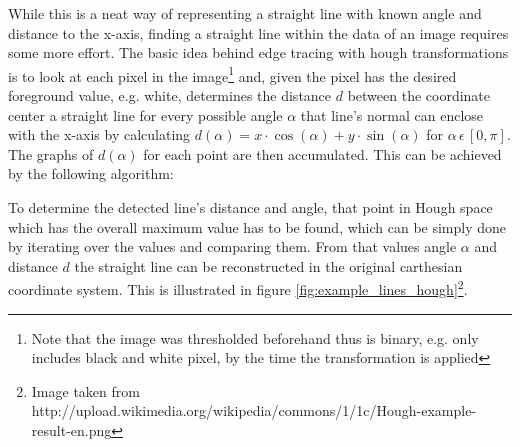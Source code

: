 \documentclass[a4paper, 12pt, twoside]{article}
\begin{document}
While this is a neat way of representing a straight line with known angle and
distance to the x-axis, finding a straight line within the data of an image
requires some more effort. The basic idea behind edge tracing with hough
transformations is to look at each pixel in the image\footnote{Note that the
image was thresholded beforehand thus is binary, e.g. only includes black and
white pixel, by the time the transformation is applied} and, given the pixel has
the desired foreground value, e.g. white, determines the distance $d$ between
the coordinate center a straight line for every possible angle $\alpha$ that
line's normal can enclose with the x-axis by calculating $d(\alpha) = x \cdot
\cos(\alpha) + y \cdot \sin(\alpha)$ for $\alpha \, \epsilon \, [0, \pi]$. The
graphs of $d(\alpha)$ for each point are then accumulated. This can be achieved
by the following algorithm:

\begin{center}
\noindent{}
\end{center}

To determine the detected line's distance and angle, that point in Hough space
which has the overall maximum value has to be found, which can be simply done by
iterating over the values and comparing them. From that values angle $\alpha$
and distance $d$ the straight line can be reconstructed in the original
carthesian coordinate system. This is illustrated in figure
\ref{fig:example_lines_hough}\footnote{Image taken from
http://upload.wikimedia.org/wikipedia/commons/1/1c/Hough-example-result-en.png}.
\end{document}
